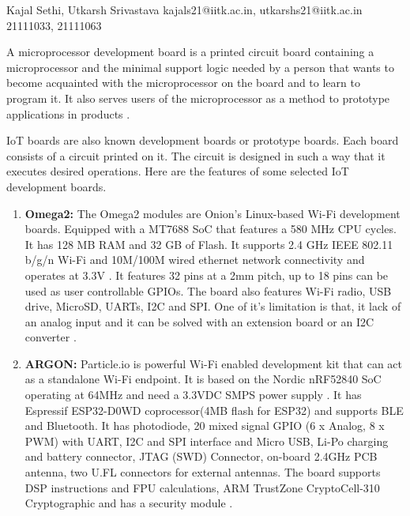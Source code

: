 \documentclass[a4paper,11pt]{article}
\begin{document}
{Kajal Sethi, Utkarsh Srivastava}                            %
{kajals21@iitk.ac.in, utkarshs21@iitk.ac.in}    %
{21111033, 21111063}             %

\begin{iotsolution}
A microprocessor development board is a printed circuit board containing a microprocessor and the minimal support logic needed by a person that wants to become acquainted with the microprocessor on the board and to learn to program it. It also serves users of the microprocessor as a method to prototype applications in products \cite{[B0]}.

IoT boards are also known development boards or prototype boards. Each board consists of a circuit printed on it. The circuit is designed in such a way that it executes desired operations. Here are the features of some selected IoT development boards.
\begin{enumerate}
    \item \textbf{Omega2:} The Omega2 modules are Onion’s Linux-based Wi-Fi development boards. Equipped with a MT7688 SoC that features a 580 MHz CPU cycles. It has 128 MB RAM and 32 GB of Flash. It supports 2.4 GHz IEEE 802.11 b/g/n Wi-Fi and 10M/100M wired ethernet network connectivity and operates at 3.3V \cite{[A7]}. It features 32 pins at a 2mm pitch, up to 18 pins can be used as user controllable GPIOs. The board also features Wi-Fi radio, USB drive, MicroSD, UARTs, I2C and SPI. One of it's limitation is that, it lack of an analog input and it can be solved with an extension board or an I2C converter \cite{[B1]}.
    \item \textbf{ARGON:} Particle.io is powerful Wi-Fi enabled development kit that can act as a standalone Wi-Fi endpoint. It is based on the Nordic nRF52840 SoC operating at 64MHz and need a 3.3VDC SMPS power supply \cite{[B2]}. It has Espressif ESP32-D0WD coprocessor(4MB flash for ESP32) and supports BLE and Bluetooth. It has photodiode, 20 mixed signal GPIO (6 x Analog, 8 x PWM) with UART, I2C and SPI interface and Micro USB, Li-Po charging and battery connector, JTAG (SWD) Connector, on-board 2.4GHz PCB antenna, two U.FL connectors for external antennas. The board supports DSP instructions and FPU calculations, ARM TrustZone CryptoCell-310 Cryptographic and has a security module \cite{[B3]}. 

\end{enumerate}
\end{iotsolution}
\end{document}
